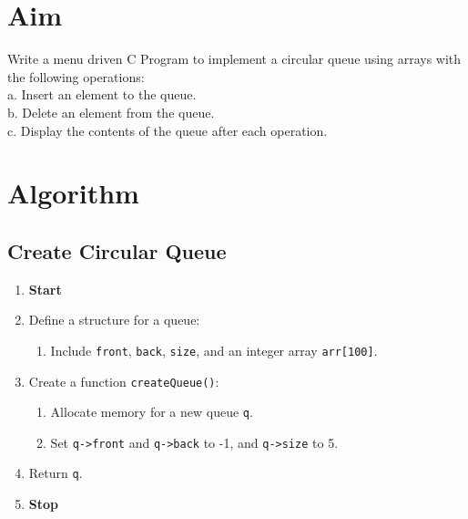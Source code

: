
\section{Aim}
Write a menu driven C Program to implement a circular queue using arrays with the
following operations:
\\a. Insert an element to the queue.
\\b. Delete an element from the queue.
\\c. Display the contents of the queue after each operation.

\section{Algorithm}
 {\selectfont

  \subsection{Create Circular Queue}
  \begin{enumerate}[label=\arabic*:,left=0pt]
    \item \textbf{Start}
    \item Define a structure for a queue:
          \begin{enumerate}[label=2.\arabic*.]
            \item Include \texttt{front}, \texttt{back}, \texttt{size}, and an integer array \texttt{arr[100]}.
          \end{enumerate}
    \item Create a function \texttt{createQueue()}:
          \begin{enumerate}[label=3.\arabic*.]
            \item Allocate memory for a new queue \texttt{q}.
            \item Set \texttt{q->front} and \texttt{q->back} to -1, and \texttt{q->size} to 5.
          \end{enumerate}
    \item Return \texttt{q}.
    \item \textbf{Stop}
  \end{enumerate}

}
